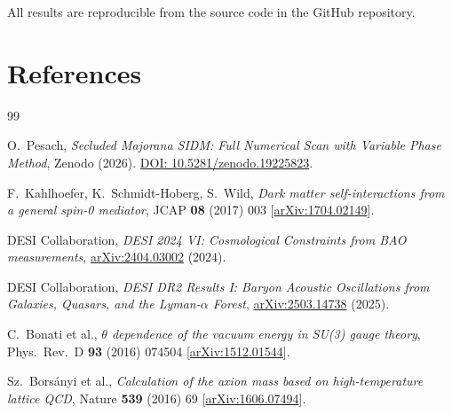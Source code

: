 \documentclass[11pt,a4paper]{article}
\begin{document}
\noindent
All results are reproducible from the source code in the GitHub repository.

\section*{References}

\begin{thebibliography}{99}

 O.~Pesach, \emph{Secluded Majorana SIDM: Full Numerical Scan with
Variable Phase Method}, Zenodo (2026). \href{https://doi.org/10.5281/zenodo.19225823}{DOI: 10.5281/zenodo.19225823}.

 F.~Kahlhoefer, K.~Schmidt-Hoberg, S.~Wild,
\emph{Dark matter self-interactions from a general spin-0 mediator},
JCAP \textbf{08} (2017) 003 [\href{https://arxiv.org/abs/1704.02149}{arXiv:1704.02149}].

 DESI Collaboration,
\emph{DESI 2024 VI: Cosmological Constraints from BAO measurements},
\href{https://arxiv.org/abs/2404.03002}{arXiv:2404.03002} (2024).

 DESI Collaboration,
\emph{DESI DR2 Results I: Baryon Acoustic Oscillations from
Galaxies, Quasars, and the Lyman-$\alpha$ Forest},
\href{https://arxiv.org/abs/2503.14738}{arXiv:2503.14738} (2025).

 C.~Bonati et al.,
\emph{$\theta$ dependence of the vacuum energy in SU(3) gauge theory},
Phys.\ Rev.\ D \textbf{93} (2016) 074504 [\href{https://arxiv.org/abs/1512.01544}{arXiv:1512.01544}].

 Sz.~Bors\'anyi et al.,
\emph{Calculation of the axion mass based on high-temperature lattice QCD},
Nature \textbf{539} (2016) 69 [\href{https://arxiv.org/abs/1606.07494}{arXiv:1606.07494}].

\end{thebibliography}
\end{document}
